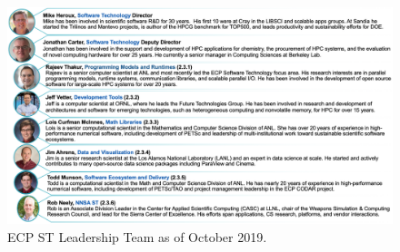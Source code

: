\begin{figure}
	\centering
	\includegraphics[width=0.9\linewidth]{ECP-ST-Leads}
	\caption{ECP ST Leadership Team as of October 2019.}
	\label{fig:ecpstleads}
\end{figure}



